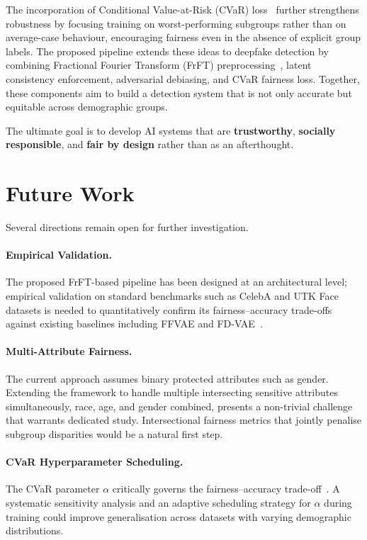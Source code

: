 The incorporation of Conditional Value-at-Risk (CVaR) loss~\cite{ju2024fairness}
further strengthens robustness by focusing training on worst-performing
subgroups rather than on average-case behaviour, encouraging fairness even in
the absence of explicit group labels.
The proposed pipeline extends these ideas to deepfake detection by combining
Fractional Fourier Transform (FrFT) preprocessing~\cite{ozaktas2001frft},
latent consistency enforcement, adversarial debiasing, and CVaR fairness loss.
Together, these components aim to build a detection system that is not only
accurate but equitable across demographic groups.

The ultimate goal is to develop AI systems that are \textbf{trustworthy},
\textbf{socially responsible}, and \textbf{fair by design} rather than as an
afterthought.

\section{Future Work}

Several directions remain open for further investigation.

\paragraph{Empirical Validation.}
The proposed FrFT-based pipeline has been designed at an architectural level;
empirical validation on standard benchmarks such as CelebA and UTK Face
datasets is needed to quantitatively confirm its fairness--accuracy trade-offs
against existing baselines including FFVAE and FD-VAE~\cite{park2020readme}.

\paragraph{Multi-Attribute Fairness.}
The current approach assumes binary protected attributes such as gender.
Extending the framework to handle multiple intersecting sensitive attributes
simultaneously, race, age, and gender combined, presents a non-trivial
challenge that warrants dedicated study.
Intersectional fairness metrics that jointly penalise subgroup disparities
would be a natural first step.

\paragraph{CVaR Hyperparameter Scheduling.}
The CVaR parameter $\alpha$ critically governs the fairness--accuracy
trade-off~\cite{ju2024fairness}.
A systematic sensitivity analysis and an adaptive scheduling strategy for
$\alpha$ during training could improve generalisation across datasets with
varying demographic distributions.

